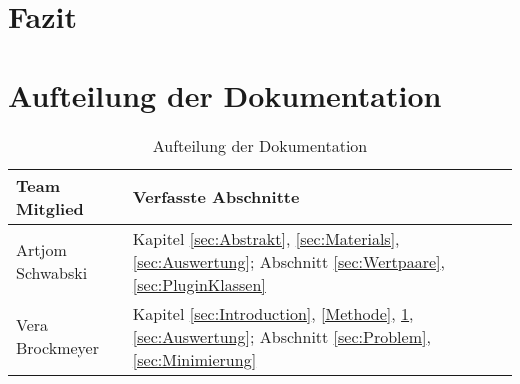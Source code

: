 \section{Fazit} \label{sec:Conclusion}

\section{Aufteilung der Dokumentation}
\begin{table}[H]
		\begin{tabular}{|p{} | p{}|} 
			\hline
			\textbf{Team Mitglied} & \textbf{Verfasste Abschnitte}\\ \hline
			Artjom Schwabski& Kapitel \ref{sec:Abstrakt}, \ref{sec:Materials}, \ref{sec:Auswertung}; Abschnitt \ref{sec:Wertpaare}, \ref{sec:PluginKlassen} \\ \hline
			Vera Brockmeyer & Kapitel \ref{sec:Introduction}, \ref{Methode}, \ref{sec:Conclusion}, \ref{sec:Auswertung}; Abschnitt \ref{sec:Problem}, \ref{sec:Minimierung} \\ \hline
		\end{tabular}
		\caption{Aufteilung der Dokumentation}
\end{table}

























